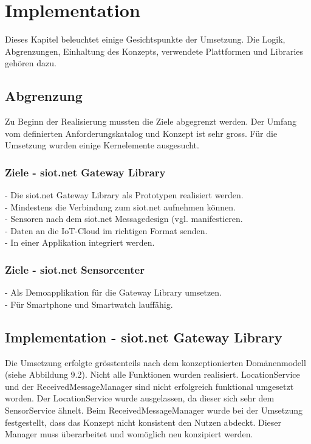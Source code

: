 \chapter{Implementation}
Dieses Kapitel beleuchtet einige Gesichtspunkte der Umsetzung. Die Logik, Abgrenzungen, Einhaltung des Konzepts, verwendete Plattformen und Libraries gehören dazu.
\section{Abgrenzung}
Zu Beginn der Realisierung mussten die Ziele abgegrenzt werden. Der Umfang vom definierten Anforderungskatalog und Konzept ist sehr gross. Für die Umsetzung wurden einige Kernelemente ausgesucht.
\subsection{Ziele - siot.net Gateway Library}
- Die siot.net Gateway Library als Prototypen realisiert werden. \\
- Mindestens die Verbindung zum siot.net aufnehmen können.\\
- Sensoren nach dem siot.net Messagedesign (vgl. \cite{siot:cobo} manifestieren.\\
- Daten an die \gls{IoT}-Cloud im richtigen Format senden.\\
- In einer Applikation integriert werden.
\subsection{Ziele - siot.net Sensorcenter}
- Als Demoapplikation für die Gateway Library umsetzen.\\
- Für Smartphone und Smartwatch lauffähig.
\section{Implementation - siot.net Gateway Library}
Die Umsetzung erfolgte grösstenteils nach dem konzeptionierten Domänenmodell (siehe Abbildung 9.2). Nicht alle Funktionen wurden realisiert. LocationService und der ReceivedMessageManager sind nicht erfolgreich funktional umgesetzt worden. Der LocationService wurde ausgelassen, da dieser sich sehr dem SensorService ähnelt. Beim ReceivedMessageManager wurde bei der Umsetzung festgestellt, dass das Konzept nicht konsistent den Nutzen abdeckt. Dieser Manager muss überarbeitet und womöglich neu konzipiert werden.
